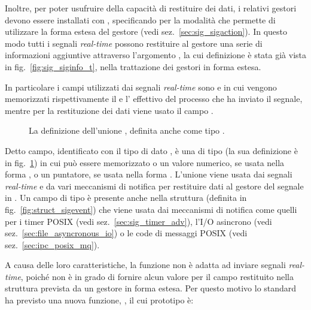 Inoltre, per poter usufruire della capacità di restituire dei dati, i relativi
gestori devono essere installati con , specificando per
 la modalità  che permette di utilizzare la
forma estesa  del gestore (vedi
sez.~\ref{sec:sig_sigaction}).  In questo modo tutti i segnali
\textit{real-time} possono restituire al gestore una serie di informazioni
aggiuntive attraverso l'argomento , la cui definizione è
stata già vista in fig.~\ref{fig:sig_siginfo_t}, nella trattazione dei gestori
in forma estesa.

In particolare i campi utilizzati dai segnali \textit{real-time} sono
 e  in cui vengono memorizzati rispettivamente il
 e l' effettivo del processo che ha inviato il segnale,
mentre per la restituzione dei dati viene usato il campo .

\begin{figure}[!htb]
  \footnotesize \centering
  \begin{minipage}[c]{0.8\textwidth}
  \end{minipage} 
  \normalsize 
  \caption{La definizione dell'unione , definita anche come
    tipo .}
  \label{fig:sig_sigval}
\end{figure}

Detto campo, identificato con il tipo di dato , è una
 di tipo  (la sua definizione è in
fig.~\ref{fig:sig_sigval}) in cui può essere memorizzato o un valore numerico,
se usata nella forma , o un puntatore, se usata nella forma
. L'unione viene usata dai segnali \textit{real-time} e da
vari meccanismi di notifica per restituire dati al gestore del segnale in
. Un campo di tipo  è presente anche nella
struttura  (definita in fig.~\ref{fig:struct_sigevent}) che
viene usata dai meccanismi di notifica come quelli per i timer POSIX (vedi
sez.~\ref{sec:sig_timer_adv}), l'I/O asincrono (vedi
sez.~\ref{sec:file_asyncronous_io}) o le code di messaggi POSIX (vedi
sez.~\ref{sec:ipc_posix_mq}).

A causa delle loro caratteristiche, la funzione  non è adatta ad
inviare segnali \textit{real-time}, poiché non è in grado di fornire alcun
valore per il campo  restituito nella struttura
 prevista da un gestore in forma estesa. Per questo motivo
lo standard ha previsto una nuova funzione, , il cui prototipo
è:

